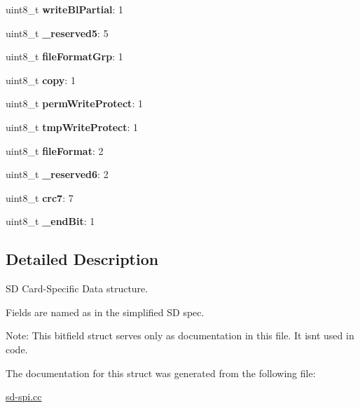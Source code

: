 \begin{DoxyCompactItemize}
uint8\+\_\+t {\bfseries write\+Bl\+Partial}\+: 1
\item 
\mbox{\label{struct_sd_csd_adfc80945cd5e7b5785a45349b1f2036c}} 
uint8\+\_\+t {\bfseries \+\_\+reserved5}\+: 5
\item 
\mbox{\label{struct_sd_csd_ada3bdf7a3821b09329407a7c872bcdb2}} 
uint8\+\_\+t {\bfseries file\+Format\+Grp}\+: 1
\item 
\mbox{\label{struct_sd_csd_a339fdc61e0628a61d83fd75e8e383cd8}} 
uint8\+\_\+t {\bfseries copy}\+: 1
\item 
\mbox{\label{struct_sd_csd_a4f833463f25d4e572bff2922061c5bd4}} 
uint8\+\_\+t {\bfseries perm\+Write\+Protect}\+: 1
\item 
\mbox{\label{struct_sd_csd_a544fbf58619407e50c16e725ea93a858}} 
uint8\+\_\+t {\bfseries tmp\+Write\+Protect}\+: 1
\item 
\mbox{\label{struct_sd_csd_abd1d77966aa79bb40691ed2b41d6d5e3}} 
uint8\+\_\+t {\bfseries file\+Format}\+: 2
\item 
\mbox{\label{struct_sd_csd_aff4c075422b25c3b28ee8b9dc7908f14}} 
uint8\+\_\+t {\bfseries \+\_\+reserved6}\+: 2
\item 
\mbox{\label{struct_sd_csd_ab4f8645c6177af04bb5fc38a7d23fac3}} 
uint8\+\_\+t {\bfseries crc7}\+: 7
\item 
\mbox{\label{struct_sd_csd_a9aa65519352646ed14338ab0cc064362}} 
uint8\+\_\+t {\bfseries \+\_\+end\+Bit}\+: 1
\end{DoxyCompactItemize}


\subsection{Detailed Description}
SD Card-\/\+Specific Data structure. 

Fields are named as in the simplified SD spec.

Note\+: This bitfield struct serves only as documentation in this file. It isn\textquotesingle{}t used in code. 

The documentation for this struct was generated from the following file\+:\begin{DoxyCompactItemize}
\item 
\hyperlink{sd-spi_8cc}{sd-\/spi.\+cc}\end{DoxyCompactItemize}
